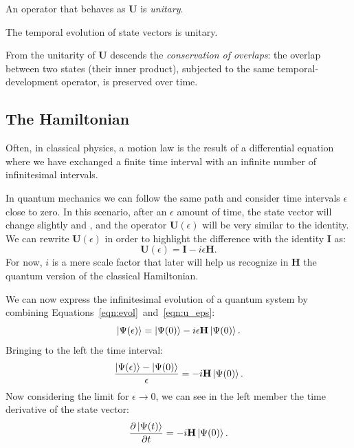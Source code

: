 An operator that behaves as $\mathbf{U}$ is \emph{unitary}.
\begin{principles}
	The temporal evolution of state vectors is unitary. 
\end{principles}

From the unitarity of $\mathbf{U}$ descends the \emph{conservation of overlaps}: the overlap between two states (their inner product), subjected to the same temporal-development operator, is preserved over time.

\subsection{The Hamiltonian}
\label{sec:hamiltonian}
Often, in classical physics, a motion law is the result of a differential equation where we have exchanged a finite time interval with an infinite number of infinitesimal intervals. 

In quantum mechanics we can follow the same path and consider time intervals $\epsilon$ close to zero. In this scenario, after an $\epsilon$ amount of time, the state vector will change slightly and , and the operator $\mathbf{U}(\epsilon)$ will be very similar to the identity. We can rewrite $\mathbf{U}(\epsilon)$ in order to highlight the difference with the identity $\mathbf{I}$ as:
\begin{equation}
	\label{eqn:u_eps}
	\mathbf{U}(\epsilon) = \mathbf{I} - i\epsilon \mathbf{H}.
\end{equation}
For now, $i$ is a mere scale factor that later will help us recognize in $\mathbf{H}$ the quantum version of the classical Hamiltonian.

We can now express the infinitesimal evolution of a quantum system by combining Equations~\ref{eqn:evol}~and~\ref{eqn:u_eps}:
\[
\Ket{\Psi(\epsilon)} = \Ket{\Psi(0)} - i \epsilon\mathbf{H}\Ket{\Psi(0)}.
\]
Bringing to the left the time interval:
\[
\frac{\Ket{\Psi(\epsilon)} - \Ket{\Psi(0)}}{\epsilon} =  - i\mathbf{H}\Ket{\Psi(0)}.
\]
Now considering the limit for $\epsilon \to 0$, we can see in the left member the time derivative of the state vector:
\[
\frac{\partial\Ket{\Psi(t)}}{\partial t} = - i \mathbf{H}\Ket{\Psi(0)}.
\]


